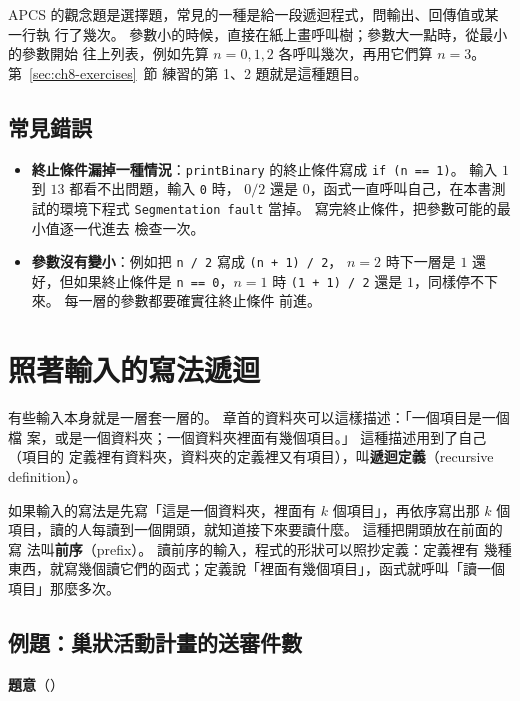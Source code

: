 \begin{apcsnote}
APCS 的觀念題是選擇題，常見的一種是給一段遞迴程式，問輸出、回傳值或某一行執
行了幾次。 參數小的時候，直接在紙上畫呼叫樹；參數大一點時，從最小的參數開始
往上列表，例如先算 $n = 0, 1, 2$ 各呼叫幾次，再用它們算 $n = 3$。 第~\ref{sec:ch8-exercises}~節
練習的第 1、2 題就是這種題目。
\end{apcsnote}

\subsection{常見錯誤}

\begin{itemize}
\item \textbf{終止條件漏掉一種情況}：\texttt{printBinary} 的終止條件寫成
\texttt{if (n == 1)}。 輸入 $1$ 到 $13$ 都看不出問題，輸入 \texttt{0} 時，
$0 / 2$ 還是 $0$，函式一直呼叫自己，在本書測試的環境下程式
\texttt{Segmentation fault} 當掉。 寫完終止條件，把參數可能的最小值逐一代進去
檢查一次。
\item \textbf{參數沒有變小}：例如把 \texttt{n / 2} 寫成 \texttt{(n + 1) / 2}，
$n = 2$ 時下一層是 $1$ 還好，但如果終止條件是 \texttt{n == 0}，$n = 1$ 時
\texttt{(1 + 1) / 2} 還是 $1$，同樣停不下來。 每一層的參數都要確實往終止條件
前進。
\end{itemize}

\section{照著輸入的寫法遞迴}
\label{sec:rec-parse}

有些輸入本身就是一層套一層的。 章首的資料夾可以這樣描述：「一個項目是一個檔
案，或是一個資料夾；一個資料夾裡面有幾個項目。」 這種描述用到了自己（項目的
定義裡有資料夾，資料夾的定義裡又有項目），叫\textbf{遞迴定義}（recursive
definition）。

如果輸入的寫法是先寫「這是一個資料夾，裡面有 $k$ 個項目」，再依序寫出那 $k$
個項目，讀的人每讀到一個開頭，就知道接下來要讀什麼。 這種把開頭放在前面的寫
法叫\textbf{前序}（prefix）。 讀前序的輸入，程式的形狀可以照抄定義：定義裡有
幾種東西，就寫幾個讀它們的函式；定義說「裡面有幾個項目」，函式就呼叫「讀一個
項目」那麼多次。

\subsection{例題：巢狀活動計畫的送審件數}
\label{sec:rec-ex-plans}

\textbf{題意}（）

